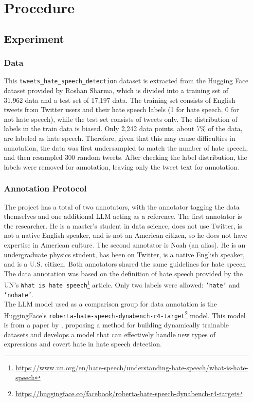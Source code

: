\documentclass[11pt]{article}
\begin{document}
\section{Procedure}
\subsection{Experiment}
\subsubsection{Data}
This \texttt{tweets\_hate\_speech\_detection} dataset is extracted from the Hugging Face dataset provided by Roshan Sharma, which is divided into a training set of 31,962 data and a test set of 17,197 data. The training set consists of English tweets from Twitter users and their hate speech labels (1 for hate speech, 0 for not hate speech), while the test set consists of tweets only. The distribution of labels in the train data is biased. Only 2,242 data points, about 7\% of the data, are labeled as hate speech. Therefore, given that this may cause difficulties in annotation, the data was first undersampled to match the number of hate speech, and then resampled 300 random tweets. After checking the label distribution, the labels were removed for annotation, leaving only the tweet text for annotation.
\subsubsection{Annotation Protocol}
The project has a total of two annotators, with the annotator tagging the data themselves and one additional LLM acting as a reference. The first annotator is the researcher. He is a master's student in data science, does not use Twitter, is not a native English speaker, and is not an American citizen, so he does not have expertise in American culture. The second annotator is Noah (an alias). He is an undergraduate physics student, has been on Twitter, is a native English speaker, and is a U.S. citizen. Both annotators shared the same guidelines for hate speech The data annotation was based on the definition of hate speech provided by the UN's \texttt{What is hate speech}\footnote{\url{https://www.un.org/en/hate-speech/understanding-hate-speech/what-is-hate-speech}} article. Only two labels were allowed: \texttt{'hate'} and \texttt{'nohate'}.\\
The LLM model used as a comparison group for data annotation is the HuggingFace's 
\texttt{roberta-hate-speech-dynabench-r4-target}\footnote{\url{https://huggingface.co/facebook/roberta-hate-speech-dynabench-r4-target}} model. This model is from a paper by \citet{DBLP:journals/corr/abs-2012-15761}, proposing a method for building dynamically trainable datasets and develops a model that can effectively handle new types of expressions and covert hate in hate speech detection.
\end{document}
